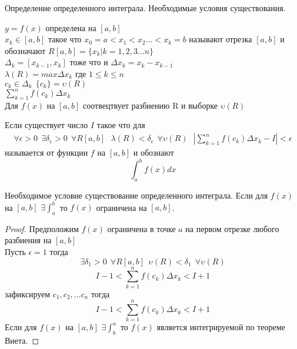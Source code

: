 \begin{title}
  Определение определенного интеграла. Необходимые условия существования.
\end{title}

$y = f(x)$ определена на $[a,b]$\\
$x_k \in [a,b]$ такое что $x_0 = a < x_1 < x_2 \ldots < x_k = b$ называют
 отрезка $[a,b]$ и обозначают $R[a,b] =
\{x_k | k = 1,2,3 \ldots n\}$\\
$\Delta_k = [x_{k-1}, x_k]$ тоже что и $\Delta{x_k} = x_k - x_{k-1}$\\
$\lambda(R) = max\Delta x_k$ где $1 \le k \le n$ \\
$c_k \in \Delta_k ~~ \{c_k\} = \upsilon(R)$ \\
$\sum_{k=1}^{n} f(c_k)\Delta x_k$ \\

Для $f(x)$ на $[a,b]$ соотвецтвует разбиению R и выборке $\upsilon(R)$\\

\begin{defin}
  Если существует число $I$ такое что для
  \begin{eqnarray*}
    \forall\epsilon>0 ~~ \exists\delta_{\epsilon}>0 ~~ \forall R[a,b] ~~~
    \lambda(R)<\delta_{\epsilon} ~~ \forall\upsilon(R) ~~~
    \left| \sum_{k=1}^{n} f(c_k)\Delta x_k - I \right| < \epsilon
  \end{eqnarray*}
  называется  от функции $f$ на $[a,b]$ и обознают
  $$\int_{a}^{b} f(x)dx$$
\end{defin}

\begin{theorem}
  Необходимое условие существование определенного интеграла. Если для $f(x)$
  на $[a,b]$ $\exists \int_{a}^{b}$ то $f(x)$ ограничена на $[a,b]$.
\end{theorem}

\begin{proof}
  Предположим $f(x)$ ограничена в точке $a$ на первом отрезке любого разбиения
  на $[a,b]$\\
  Пусть $\epsilon = 1$ тогда \[\exists \delta_1 > 0 ~~ \forall R[a,b] ~~
  \upsilon(R) < \delta_1 ~~ \forall \upsilon(R)\]
  \[I-1 < \sum_{k=1}^{n} f(c_k)\Delta x_k < I+1\] зафиксируем $c_1, c_2, \ldots c_n$
  тогда \[I-1 < \sum_{k=1}^{n} f(c_k)\Delta x_k < I+1\]
  Если для $f(x)$ на $[a,b]$ $\exists \int_{b}^{a}$ то $f(x)$
  является интегрируемой по теореме Виета.
\end{proof}

